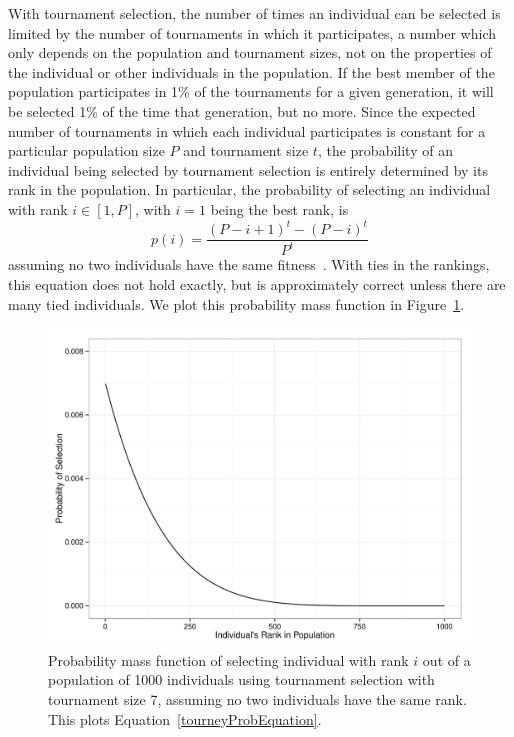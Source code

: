 \documentclass{sig-alternate}
\begin{document}
With tournament selection, the number of times an individual can be selected is limited by the number of tournaments in which it participates, a number which only depends on the population and tournament sizes, not on the properties of the individual or other individuals in the population. If the best member of the population participates in 1\% of the tournaments for a given generation, it will be selected 1\% of the time that generation, but no more.
 Since the expected number of tournaments in which each individual participates is constant for a particular population size $P$ and tournament size $t$, the probability of an individual being selected by tournament selection is entirely determined by its rank in the population. In particular, the probability of selecting an individual with rank $i \in [1,P]$, with $i = 1$ being the best rank, is
\begin{equation}\label{tourneyProbEquation}
p(i) = \frac{(P-i+1)^t - (P-i)^t}{P^t}
\end{equation}
assuming no two individuals have the same fitness~\cite{350042, Blickle:1995:MAT:645514.658088}. With ties in the rankings, this equation does not hold exactly, but is approximately correct unless there are many tied individuals. We plot this probability mass function in Figure~\ref{fig:prob-selection-tourney-7}.

\begin{figure}[t] %
\centering
\includegraphics[width=\linewidth]{probSelectionTourney7.pdf}
\caption{Probability mass function of selecting individual with rank $i$ out of a population of 1000 individuals using tournament selection with tournament size 7, assuming no two individuals have the same rank. This plots Equation~\ref{tourneyProbEquation}.}
\label{fig:prob-selection-tourney-7}
\end{figure}
\end{document}
